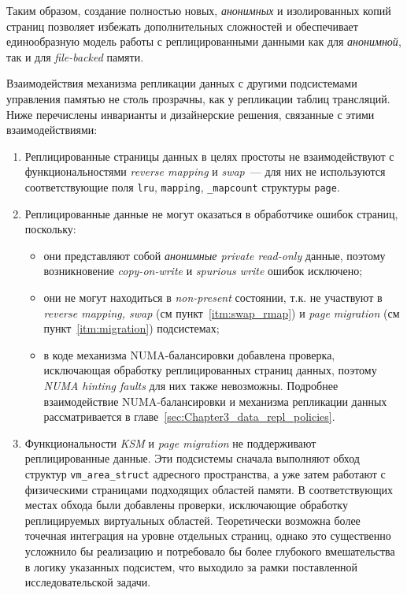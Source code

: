 Таким образом, создание полностью новых, \textit{анонимных} и изолированных копий страниц позволяет избежать дополнительных сложностей и обеспечивает единообразную модель работы с реплицированными данными как для \textit{анонимной}, так и для \textit{file-backed} памяти.

Взаимодействия механизма репликации данных с другими подсистемами управления памятью не столь прозрачны, как у репликации таблиц трансляций. Ниже перечислены инварианты и дизайнерские решения, связанные с этими взаимодействиями:
\begin{enumerate}
    \item\label{itm:swap_rmap} Реплицированные страницы данных в целях простоты не взаимодействуют с функциональностями \textit{reverse mapping}\cite{rmap1, rmap2} и \textit{swap}~--- для них не используются соответствующие поля \texttt{lru}, \texttt{mapping}, \texttt{\_mapcount} структуры \texttt{page}.

    \item Реплицированные данные не могут оказаться в обработчике ошибок страниц, поскольку:
    \begin{itemize}
        \item они представляют собой \textit{анонимные private read-only} данные, поэтому возникновение \textit{copy-on-write} и \textit{spurious write} ошибок исключено;
        \item они не могут находиться в \textit{non-present} состоянии, т.к. не участвуют в \textit{reverse mapping, swap} (см пункт~\ref{itm:swap_rmap}) и \textit{page migration} (см пункт~\ref{itm:migration}) подсистемах;
        \item в коде механизма NUMA-балансировки добавлена проверка, исключающая обработку реплицированных страниц данных, поэтому \textit{NUMA hinting faults} для них также невозможны. Подробнее взаимодействие NUMA-балансировки и механизма репликации данных рассматривается в главе~\ref{sec:Chapter3_data_repl_policies}.
    \end{itemize}

    \item\label{itm:migration} Функциональности \textit{KSM}\cite{KSM} и \textit{page migration}\cite{page_migration} не поддерживают реплицированные данные. Эти подсистемы сначала выполняют обход структур \texttt{vm\_area\_struct} адресного пространства, а уже затем работают с физическими страницами подходящих областей памяти. В соответствующих местах обхода были добавлены проверки, исключающие обработку реплицируемых виртуальных областей. Теоретически возможна более точечная интеграция на уровне отдельных страниц, однако это существенно усложнило бы реализацию и потребовало бы более глубокого вмешательства в логику указанных подсистем, что выходило за рамки поставленной исследовательской задачи.


\end{enumerate}
